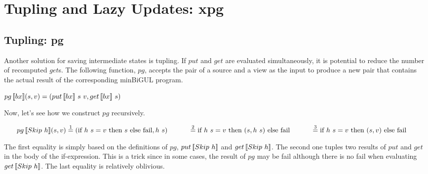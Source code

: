 \section{Tupling and Lazy Updates: xpg} \label{sect:xpg}
\subsection{Tupling: pg} \label{sect:pg}

Another solution for saving intermediate states is tupling. If $put$ and $get$ are evaluated simultaneously, it is potential to reduce the number of recomputed $get$s. The following function, $pg$, accepts the pair of a source and a view as the input to produce a new pair that contains the actual result of the corresponding minBiGUL program.

\begin{definition}
    $pg \, [\![bx]\!] (s, v) = (put \, [\![bx]\!] \ s \ v, get \, [\![bx]\!] \ s)$
\end{definition}



\noindent Now, let's see how we construct $pg$ recursively.

    \noindent $\tabs{2} \pg{Skip \ h}{s}{v} \overset{1}{=} (\sif{h \ s = v}{s}{\text{fail}}, h \ s) \\
        \tab \qtab \overset{2}{=} \sif{h \ s = v}{(s, h \ s)}{\text{fail}} \\
        \tab \qtab \overset{3}{=} \sif{h \ s = v}{(s, v)}{\text{fail}}$

The first equality is simply based on the definitions of $pg$, $put \, [\![Skip \ h]\!]$ and $get \, [\![Skip \ h]\!]$. The second one tuples two results of $put$ and $get$ in the body of the if-expression. This is a trick since in some cases, the result of $pg$ may be fail although there is no fail when evaluating $get \, [\![Skip \ h]\!]$. The last equality is relatively oblivious.

